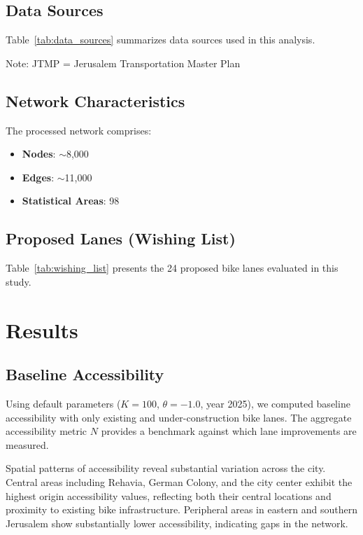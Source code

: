 \documentclass[12pt,a4paper]{article}
\begin{document}
\subsection{Data Sources}

Table~\ref{tab:data_sources} summarizes data sources used in this analysis.



\noindent Note: JTMP = Jerusalem Transportation Master Plan

\subsection{Network Characteristics}

The processed network comprises:
\begin{itemize}
    \item \textbf{Nodes}: $\sim$8,000
    \item \textbf{Edges}: $\sim$11,000
    \item \textbf{Statistical Areas}: 98
\end{itemize}

\subsection{Proposed Lanes (Wishing List)}

Table~\ref{tab:wishing_list} presents the 24 proposed bike lanes evaluated in this study.



\section{Results}
\label{sec:results}

\subsection{Baseline Accessibility}

Using default parameters ($K=100$, $\theta=-1.0$, year 2025), we computed baseline accessibility with only existing and under-construction bike lanes. The aggregate accessibility metric $N$ provides a benchmark against which lane improvements are measured.

Spatial patterns of accessibility reveal substantial variation across the city. Central areas including Rehavia, German Colony, and the city center exhibit the highest origin accessibility values, reflecting both their central locations and proximity to existing bike infrastructure. Peripheral areas in eastern and southern Jerusalem show substantially lower accessibility, indicating gaps in the network.
\end{document}
